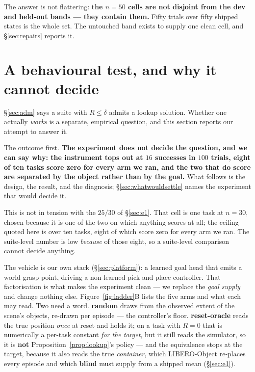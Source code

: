 \documentclass[10pt,twocolumn]{article}
\begin{document}
\noindent The answer is not flattering: \textbf{the $n{=}50$ cells are not
disjoint from the dev and held-out bands --- they contain them.} Fifty trials over fifty shipped states is
the whole set. The untouched band exists to supply one clean cell, and
\S\ref{sec:repairs} reports it.

\section{A behavioural test, and why it cannot decide}
\label{sec:constant}

\S\ref{sec:adm} says a suite with $R \le \delta$ admits a lookup solution.
Whether one actually \emph{works} is a separate, empirical question, and this
section reports our attempt to answer it.

The outcome first. \textbf{The experiment does not decide the question, and we
can say why: the instrument tops out at $16$
successes in $100$ trials, eight of ten tasks score zero for every arm we ran,
and the two that do score are separated by the object rather than by the goal.}
What follows is the design, the result, and the diagnosis;
\S\ref{sec:whatwouldsettle} names the experiment that would decide it.

This is not in tension with the $25/30$ of \S\ref{sec:e1}. That cell is one
task at $n{=}30$, chosen because it is one of the two on which anything scores
at all; the ceiling quoted here is over ten tasks, eight of which score zero
for every arm we ran. The suite-level number is low \emph{because} of those
eight, so a suite-level comparison cannot decide anything.

The vehicle is our own stack (\S\ref{sec:platform}): a learned goal head that
emits a world grasp point, driving a non-learned pick-and-place controller.
That factorisation is what makes the experiment clean --- we replace the
\emph{goal supply} and change nothing else. Figure~\ref{fig:ladder}B lists the
five arms and what each may read. Two need a word. \textbf{random} draws from
the observed extent of the scene's objects, re-drawn per episode --- the
controller's floor. \textbf{reset-oracle} reads the true position \emph{once}
at reset and holds it; on a task with $R=0$ that is numerically a per-task
constant \emph{for the target}, but it still reads the simulator, so it is
\textbf{not} Proposition~\ref{prop:lookup}'s policy --- and the equivalence
stops at the target, because it also reads the true \emph{container}, which
LIBERO-Object re-places every episode and which \textbf{blind} must supply from
a shipped mean (\S\ref{sec:e1}).
\end{document}
